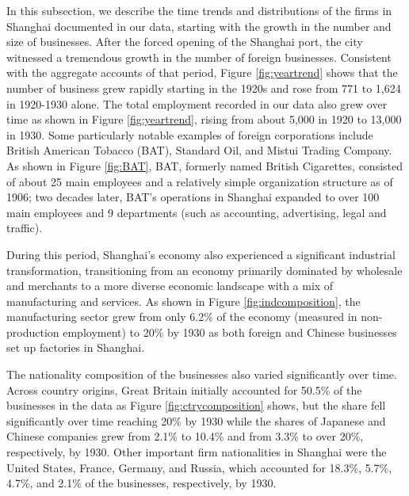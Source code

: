 \documentclass[12pt]{article}
\begin{document}
In this subsection, we describe the time trends and distributions of the firms in Shanghai documented in our data, starting with the growth in the number and size of businesses. After the forced opening of the Shanghai port, the city witnessed a tremendous growth in the number of foreign businesses. Consistent with the aggregate accounts of that period, Figure \ref{fig:yeartrend} shows that the number of business grew rapidly starting in the 1920s and rose from 771 to 1,624 in 1920-1930 alone. The total employment recorded in our data also grew over time as shown in Figure \ref{fig:yeartrend}, rising from about 5,000 in 1920 to 13,000 in 1930. Some particularly notable examples of foreign corporations include British American Tobacco (BAT), Standard Oil, and Mistui Trading Company. As shown in Figure \ref{fig:BAT}, BAT, formerly named British Cigarettes, consisted of about 25 main employees and a relatively simple organization structure as of 1906; two decades later, BAT's operations in Shanghai expanded to over 100 main employees and 9 departments (such as accounting, advertising, legal and traffic). 

During this period, Shanghai's economy also experienced a significant industrial transformation, transitioning from an economy primarily dominated by wholesale and merchants to a more diverse economic landscape with a mix of manufacturing and services. As shown in Figure \ref{fig:indcomposition}, the manufacturing sector grew from only 6.2\% of the economy (measured in non-production employment) to 20\% by 1930 as both foreign and Chinese businesses set up factories in Shanghai.

The nationality composition of the businesses also varied significantly over time. Across country origins, Great Britain initially accounted for 50.5\% of the businesses in the data as Figure \ref{fig:ctrycomposition} shows, but the share fell significantly over time reaching 20\% by 1930 while the shares of Japanese and Chinese companies grew from 2.1\% to 10.4\% and from 3.3\% to over 20\%, respectively, by 1930. Other important firm nationalities in Shanghai were the United States, France, Germany, and Russia, which accounted for 18.3\%, 5.7\%, 4.7\%, and 2.1\% of the businesses, respectively, by 1930. %
\end{document}
